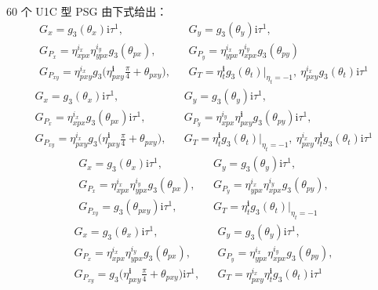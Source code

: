 60 个 U1C 型 PSG 由下式给出：
\begin{equation*}
\begin{array}{rcl}
G_{x}=g_{3}(\theta_{x})\mathrm{i}\tau^{1}, & & G_{y}=g_{3}(\theta_{y})\mathrm{i}\tau^{1},\\[2pt]
G_{P_{x}}=\eta_{xpx}^{i_{x}}\eta_{ypx}^{i_{y}}g_{3}(\theta_{px}), & & G_{P_{y}}=\eta_{ypx}^{i_{x}}\eta_{xpx}^{i_{y}}g_{3}(\theta_{py})\\[2pt]
G_{P_{xy}}=\eta_{pxy}^{i_{x}}g_{3}\big(\eta_{pxy}^{\pmb{i}}\frac{\pi}{4}+\theta_{pxy}\big), & & G_{T}=\eta_{t}^{\pmb{i}}g_{3}(\theta_{t})\big|_{\eta_{t}=-1},\ \eta_{pxy}^{i_{x}}g_{3}(\theta_{t})\mathrm{i}\tau^{1}
\end{array}
\tag{9.4.25}
\end{equation*}
\begin{equation*}
\begin{array}{rcl}
G_{x}=g_{3}(\theta_{x})\mathrm{i}\tau^{1}, & & G_{y}=g_{3}(\theta_{y})\mathrm{i}\tau^{1},\\[2pt]
G_{P_{x}}=\eta_{xpx}^{i_{x}}g_{3}(\theta_{px})\mathrm{i}\tau^{1}, & & G_{P_{y}}=\eta_{xpx}^{i_{y}}\eta_{pxy}^{\pmb{i}}g_{3}(\theta_{py})\mathrm{i}\tau^{1},\\[2pt]
G_{P_{xy}}=\eta_{pxy}^{i_{x}}g_{3}\big(\eta_{pxy}^{\pmb{i}}\frac{\pi}{4}+\theta_{pxy}\big), & & G_{T}=\eta_{t}^{\pmb{i}}g_{3}(\theta_{t})\big|_{\eta_{t}=-1},\ \eta_{pxy}^{i_{x}}\eta_{t}^{\pmb{i}}g_{3}(\theta_{t})\mathrm{i}\tau^{1}
\end{array}
\tag{9.4.26}
\end{equation*}
\begin{equation*}
\begin{array}{rcl}
G_{x}=g_{3}(\theta_{x})\mathrm{i}\tau^{1}, & & G_{y}=g_{3}(\theta_{y})\mathrm{i}\tau^{1},\\[2pt]
G_{P_{x}}=\eta_{xpx}^{i_{x}}\eta_{ypx}^{i_{y}}g_{3}(\theta_{px}), & & G_{P_{y}}=\eta_{ypx}^{i_{x}}\eta_{xpx}^{i_{y}}g_{3}(\theta_{py}),\\[2pt]
G_{P_{xy}}=g_{3}(\theta_{pxy})\mathrm{i}\tau^{1}, & & G_{T}=\eta_{t}^{\pmb{i}}g_{3}(\theta_{t})\big|_{\eta_{t}=-1}
\end{array}
\tag{9.4.27}
\end{equation*}
\begin{equation*}
\begin{array}{rcl}
G_{x}=g_{3}(\theta_{x})\mathrm{i}\tau^{1}, & & G_{y}=g_{3}(\theta_{y})\mathrm{i}\tau^{1},\\[2pt]
G_{P_{x}}=\eta_{xpx}^{i_{x}}\eta_{ypx}^{i_{y}}g_{3}(\theta_{px}), & & G_{P_{y}}=\eta_{ypx}^{i_{x}}\eta_{xpx}^{i_{y}}g_{3}(\theta_{py}),\\[2pt]
G_{P_{xy}}=g_{3}\big(\eta_{pxy}^{\pmb{i}}\frac{\pi}{4}+\theta_{pxy}\big)\mathrm{i}\tau^{1}, & & G_{T}=\eta_{pxy}^{i_{x}}\eta_{t}^{\pmb{i}}g_{3}(\theta_{t})\mathrm{i}\tau^{1}
\end{array}
\tag{9.4.28}
\end{equation*}

